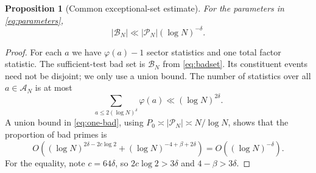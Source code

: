 \documentclass[11pt]{article}
\newtheorem{proposition}[theorem]{Proposition}
\theoremstyle{remark}\newtheorem{remark}[theorem]{Remark}
\newcommand{\cP}{\mathcal P}
\newcommand{\cA}{\mathcal A}
\newcommand{\cB}{\mathcal B}
\begin{document}
\begin{proposition}[Common exceptional-set estimate]\label{prop:commonbad}
For the parameters in \eqref{eq:parameters},
\[
 |\cB_N|\ll|\cP_N|(\log N)^{-\delta}.
\]
\end{proposition}
\begin{proof}
For each $a$ we have $\varphi(a)-1$ sector statistics and one total
factor statistic. The sufficient-test bad set is $\cB_N$ from \eqref{eq:badset}.
Its constituent events need not be disjoint; we only use a union bound.
The number of statistics over all $a\in\cA_N$ is at most
\begin{equation}\label{eq:union-budget}
 \sum_{a\le2(\log N)^\delta}\varphi(a)\ll(\log N)^{2\delta}.
\end{equation}
A union bound in \eqref{eq:one-bad}, using
$P_0\asymp|\cP_N|\asymp N/\log N$, shows that the proportion of
bad primes is
\begin{equation}\label{eq:bad-rate}
 O\left((\log N)^{2\delta-2c\log2}
        +(\log N)^{-4+\beta+2\delta}\right)
       =O((\log N)^{-\delta}).
\end{equation}
For the equality, note $c=64\delta$, so
$2c\log2>3\delta$ and $4-\beta>3\delta$.

\end{proof}
\end{document}
